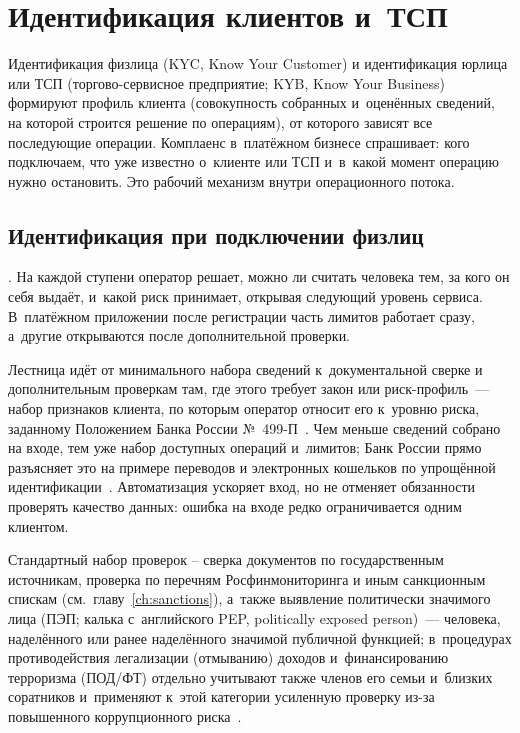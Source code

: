 
\chapter{Идентификация клиентов и~ТСП}\label{ch:kyc-kyb}
Идентификация физлица (KYC, Know Your Customer) и идентификация
юрлица или ТСП (торгово-сервисное предприятие; KYB, Know Your Business)
формируют профиль клиента (совокупность собранных и~оценённых сведений,
на которой строится решение по операциям),
от которого зависят все последующие операции.
Комплаенс в~платёжном бизнесе спрашивает: кого
подключаем, что уже известно о~клиенте или ТСП и~в~какой момент
операцию нужно остановить. Это рабочий механизм внутри операционного потока.

\section{Идентификация при подключении физлиц}\label{sec:kyc-individuals}

. На каждой ступени оператор решает, можно ли считать
человека тем, за кого он себя выдаёт, и~какой риск принимает,
открывая следующий уровень сервиса. В~платёжном приложении после
регистрации часть лимитов работает сразу, а~другие открываются
после дополнительной проверки.

Лестница идёт от минимального набора сведений к~документальной
сверке и дополнительным проверкам там, где этого требует закон или
риск-профиль~--- набор признаков клиента, по которым оператор
относит его к~уровню риска, заданному Положением Банка России
№~499-П~\cite{cbr-499p}. Чем меньше сведений собрано на входе,
тем уже набор доступных операций и~лимитов; Банк России прямо
разъясняет это на примере переводов и электронных кошельков по
упрощённой идентификации~\cite{cbr-banking-faq-identification}.
Автоматизация ускоряет вход, но не отменяет обязанности проверять
качество данных: ошибка на входе редко ограничивается одним клиентом.

Стандартный набор проверок -- сверка документов
по государственным источникам, проверка по перечням
Росфинмониторинга и иным санкционным спискам (см.\ главу~\ref{ch:sanctions}),
а~также выявление политически значимого лица (ПЭП; калька
с~английского PEP, politically exposed person)~--- человека, наделённого
или ранее наделённого значимой публичной функцией; в~процедурах
противодействия легализации (отмыванию) доходов и~финансированию
терроризма (ПОД/ФТ) отдельно учитывают также членов его семьи
и~близких соратников и~применяют к~этой категории усиленную проверку
из-за повышенного коррупционного риска~\cite{cbr-499p,fatf-pep-guidance}.

